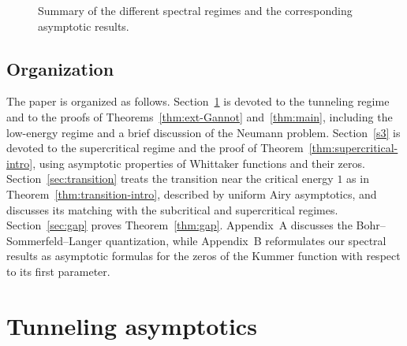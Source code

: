 \documentclass[11pt]{amsart}
\numberwithin{equation}{section}
\theoremstyle{remark}
\begin{document}
\begin{figure}[h]
{}
  \caption{Summary of the different spectral regimes and the corresponding asymptotic results.} \label{fig:spectral-regimes*}
\end{figure}




%




\subsection{Organization}

The paper is organized as follows. Section~\ref{s2} is devoted to the tunneling
regime and to the proofs of Theorems~\ref{thm:ext-Gannot} and~\ref{thm:main}, including the low-energy
regime and a brief discussion of the Neumann problem.
Section~\ref{s3} is devoted to the supercritical regime and the proof of Theorem~\ref{thm:supercritical-intro}, using asymptotic
properties of Whittaker functions and their zeros.
Section~\ref{sec:transition} treats the transition near the critical energy $1$ as in Theorem~\ref{thm:transition-intro}, described
by uniform Airy asymptotics, and discusses its matching with the
subcritical and supercritical regimes.  Section~\ref{sec:gap} proves Theorem~\ref{thm:gap}.
Appendix~A discusses the Bohr--Sommerfeld--Langer quantization, while
Appendix~B reformulates our spectral results as asymptotic formulas for
the zeros of the Kummer function with respect to its first parameter.








\section{Tunneling asymptotics}\label{s2}
\end{document}
